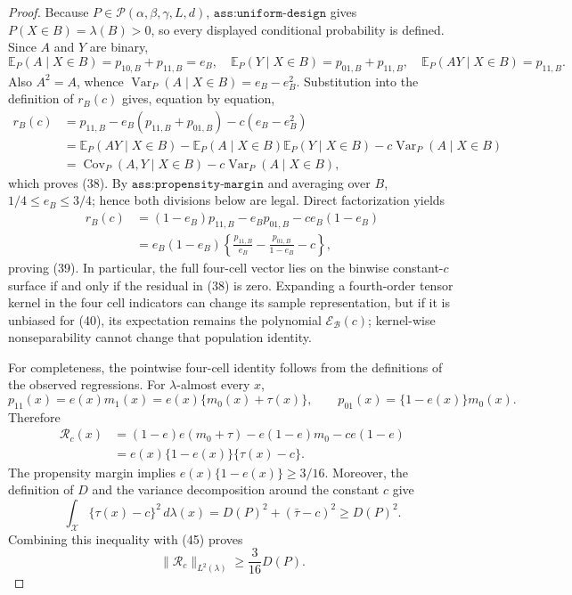 \documentclass{article}
\begin{document}
\begin{proof}
Because \(P\in\mathcal P(\alpha,\beta,\gamma,L,d)\), \(\texttt{ass:uniform-design}\) gives \(P(X\in B)=\lambda(B)>0\), so every displayed conditional probability is defined.  Since \(A\) and \(Y\) are binary,
\[
 \mathbb E_P(A\mid X\in B)=p_{10,B}+p_{11,B}=e_B,
 \quad
 \mathbb E_P(Y\mid X\in B)=p_{01,B}+p_{11,B},
 \quad
 \mathbb E_P(AY\mid X\in B)=p_{11,B}.                                                  \tag{42}
\]
Also \(A^2=A\), whence \(\operatorname{Var}_P(A\mid X\in B)=e_B-e_B^2\).  Substitution into the definition of \(r_B(c)\) gives, equation by equation,
\[
 \begin{aligned}
 r_B(c)
 &=p_{11,B}-e_B(p_{11,B}+p_{01,B})-c(e_B-e_B^2)\\
 &=\mathbb E_P(AY\mid X\in B)
   -\mathbb E_P(A\mid X\in B)\mathbb E_P(Y\mid X\in B)
   -c\operatorname{Var}_P(A\mid X\in B)\\
 &=\operatorname{Cov}_P(A,Y\mid X\in B)
   -c\operatorname{Var}_P(A\mid X\in B),
 \end{aligned}                                                                         \tag{43}
\]
which proves (38).  By \(\texttt{ass:propensity-margin}\) and averaging over \(B\), \(1/4\le e_B\le3/4\); hence both divisions below are legal.  Direct factorization yields
\[
 \begin{aligned}
 r_B(c)
 &=(1-e_B)p_{11,B}-e_Bp_{01,B}-c e_B(1-e_B)\\
 &=e_B(1-e_B)
 \left\{\frac{p_{11,B}}{e_B}-\frac{p_{01,B}}{1-e_B}-c\right\},
 \end{aligned}                                                                         \tag{44}
\]
proving (39).  In particular, the full four-cell vector lies on the binwise constant-\(c\) surface if and only if the residual in (38) is zero.  Expanding a fourth-order tensor kernel in the four cell indicators can change its sample representation, but if it is unbiased for (40), its expectation remains the polynomial \(\mathcal E_{\mathcal B}(c)\); kernel-wise nonseparability cannot change that population identity.

For completeness, the pointwise four-cell identity follows from the definitions of the observed regressions.  For \(\lambda\)-almost every \(x\),
\[
 p_{11}(x)=e(x)m_1(x)=e(x)\{m_0(x)+\tau(x)\},
 \qquad
 p_{01}(x)=\{1-e(x)\}m_0(x).
\]
Therefore
\[
 \begin{aligned}
 \mathcal R_c(x)
 &=(1-e)e(m_0+\tau)-e(1-e)m_0-ce(1-e)\\
 &=e(x)\{1-e(x)\}\{\tau(x)-c\}.                                                        \tag{45}
 \end{aligned}
\]
The propensity margin implies \(e(x)\{1-e(x)\}\ge3/16\).  Moreover, the definition of \(D\) and the variance decomposition around the constant \(c\) give
\[
 \int_{\mathcal X}\{\tau(x)-c\}^2\,d\lambda(x)
 =D(P)^2+(\bar\tau-c)^2\ge D(P)^2.
\]
Combining this inequality with (45) proves
\[
 \|\mathcal R_c\|_{L^2(\lambda)}\ge\frac3{16}D(P).                                    \tag{46}
\]


\end{proof}
\end{document}
